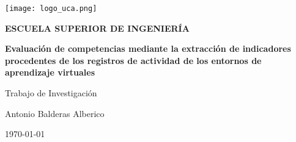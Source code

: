 

\begin{titlepage}

  \begin{center}

    \texttt{[image: logo\_uca.png]} \\
    
    \vspace{2.0cm}
    
    \LARGE{\textbf{ESCUELA SUPERIOR DE INGENIERÍA}} \\
    
    \vspace{1.0cm}
    
    \Large{\textbf{Evaluación de competencias mediante la extracción de indicadores procedentes de los registros de actividad de los entornos de aprendizaje virtuales}} \\
    
    \vspace{3.0cm}
    
    \Large{Trabajo de Investigación} \\
    
    \vspace{2.0cm}
    
    \Large{Antonio Balderas Alberico} \\
  
    \vspace{0.5cm}

    \large{\today}
    
  \end{center}
\end{titlepage}
